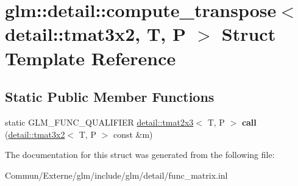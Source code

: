 \hypertarget{structglm_1_1detail_1_1compute__transpose_3_01detail_1_1tmat3x2_00_01_t_00_01_p_01_4}{}\section{glm\+:\+:detail\+:\+:compute\+\_\+transpose$<$ detail\+:\+:tmat3x2, T, P $>$ Struct Template Reference}
\label{structglm_1_1detail_1_1compute__transpose_3_01detail_1_1tmat3x2_00_01_t_00_01_p_01_4}
\subsection*{Static Public Member Functions}
\begin{DoxyCompactItemize}
\item 
static G\+L\+M\+\_\+\+F\+U\+N\+C\+\_\+\+Q\+U\+A\+L\+I\+F\+I\+ER \hyperlink{structglm_1_1detail_1_1tmat2x3}{detail\+::tmat2x3}$<$ T, P $>$ {\bfseries call} (\hyperlink{structglm_1_1detail_1_1tmat3x2}{detail\+::tmat3x2}$<$ T, P $>$ const \&m)\hypertarget{structglm_1_1detail_1_1compute__transpose_3_01detail_1_1tmat3x2_00_01_t_00_01_p_01_4_a0a30f21e987d479af32a28eb6aeb5def}{}\label{structglm_1_1detail_1_1compute__transpose_3_01detail_1_1tmat3x2_00_01_t_00_01_p_01_4_a0a30f21e987d479af32a28eb6aeb5def}

\end{DoxyCompactItemize}


The documentation for this struct was generated from the following file\+:\begin{DoxyCompactItemize}
\item 
Commun/\+Externe/glm/include/glm/detail/func\+\_\+matrix.\+inl\end{DoxyCompactItemize}
